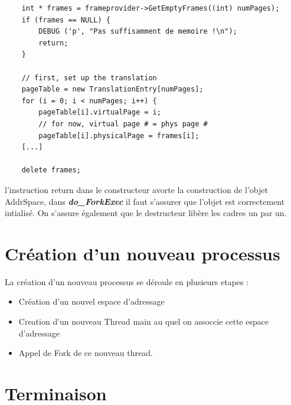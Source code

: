 \documentclass[a4paper,10pt]{article}
\begin{document}
\begin{lstlisting}
    int * frames = frameprovider->GetEmptyFrames((int) numPages);
    if (frames == NULL) {
        DEBUG ('p', "Pas suffisamment de memoire !\n");
        return;
    }

    // first, set up the translation
    pageTable = new TranslationEntry[numPages];
    for (i = 0; i < numPages; i++) {
        pageTable[i].virtualPage = i;
        // for now, virtual page # = phys page #
        pageTable[i].physicalPage = frames[i];
    [...]

    delete frames;
\end{lstlisting}

l'instruction return dans le constructeur avorte la construction de l'objet
AddrSpace, dans \textbf{\textit{do\_ForkExec}} il faut s'assurer que l'objet est
correctement intialisé.
On s'assure également que le destructeur libère les cadres un par un.


\section{Création d'un nouveau processus}

La création d'un nouveau processus se déroule en plusieurs etapes :
\begin{itemize}
\item Création d'un nouvel espace d'adressage
\item Creation d'un nouveau Thread main au quel on assoccie cette espace
d'adressage
\item Appel de Fork de ce nouveau thread.
\end{itemize}



\section{Terminaison}
\end{document}

